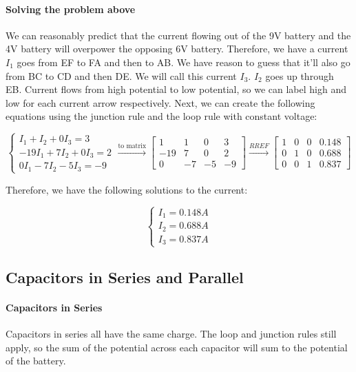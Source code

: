 \documentclass{scrartcl}
\theoremstyle{definition}
\begin{document}
\begin{center}
	
	\begin{flushleft}
	\item \paragraph{Solving the problem above} We can reasonably predict that the current flowing out of the 9V battery and the 4V battery will overpower the opposing 6V battery. Therefore, we have a current $I_1$ goes from EF to FA and then to AB. We have reason to guess that it'll also go from BC to CD and then DE. We will call this current $I_3$. $I_2$ goes up through EB. Current flows from high potential to low potential, so we can label high and low for each current arrow respectively. Next, we can create the following equations using the junction rule and the loop rule with constant voltage:
	
	$$
	\begin{cases}
		I_1 + I_2 + 0I_3 = 3 \\
		-19 I_1  + 7I_2 + 0I_3 = 2 \\	
		0I_1 - 7I_2 - 5I_3 = -9
	\end{cases} \xrightarrow{\text{to matrix}} \begin{bmatrix} 1 & 1 & 0 & 3 \\ -19 & 7 & 0 & 2 \\ 0 & -7 & -5 & -9 \end{bmatrix} \xrightarrow{RREF} \begin{bmatrix} 1 & 0 & 0 & 0.148 \\ 0 & 1 & 0 & 0.688 \\ 0 & 0 & 1 & 0.837 \end{bmatrix}
	$$
	
	\noindent Therefore, we have the following solutions to the current:
	
	$$
	\begin{cases}
		I_1 = 0.148 A \\ I_2 = 0.688 A \\ I_3 = 0.837 A
	\end{cases}
	$$
	\end{flushleft}
	\end{center}
	
	\subsection{Capacitors in Series and Parallel}
	
	\paragraph{Capacitors in Series} Capacitors in series all have the same charge. The loop and junction rules still apply, so the sum of the potential across each capacitor will sum to the potential of the battery.
	
\end{document}
